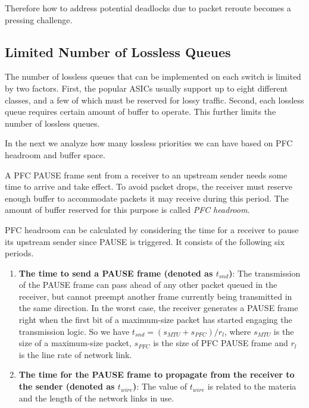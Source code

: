 {Therefore how to address potential deadlocks due to packet reroute becomes a pressing challenge.


\subsection{Limited Number of Lossless Queues}\label{subsec:pfcheadroom}

The number of lossless queues that can be implemented on each switch is limited by two factors. First, the popular ASICs usually support up to eight different classes,
and a few of which must be reserved for lossy traffic. Second, each lossless queue requires certain amount of buffer to operate. This further limits the number of
lossless queues.

In the next we analyze how many lossless priorities we can have based on PFC headroom and buffer space.

A PFC PAUSE frame sent from a receiver to an upstream sender needs some time to arrive and take effect. To avoid packet drops, the receiver must reserve enough buffer to accommodate packets it may receive during this period. The amount of buffer reserved for this purpose is called \textit{PFC headroom}. 

PFC headroom can be calculated by considering the time for a receiver to pause its upstream sender since  PAUSE is triggered. It consists of the following six periods.

\begin{enumerate}
	
\item\textbf{The time to send a PAUSE frame (denoted as $t_{snd}$)}: The transmission of the PAUSE frame  can pass ahead of any other packet queued in the receiver, but cannot preempt another frame currently being transmitted in the same direction. In the worst case, the receiver generates a PAUSE frame right when the first bit of a maximum-size packet has started engaging the transmission logic. So we have  $t_{snd}=(s_{MTU}+s_{PFC})/r_{l}$, where $s_{MTU}$ is the size of a maximum-size packet, $s_{PFC}$ is the size of PFC PAUSE frame and $r_{l}$ is the line rate of network link.

\item\textbf{The time for the PAUSE frame to propagate from the receiver to the sender (denoted as $t_{wire}$)}: The value of  $t_{wire}$ is related to the materia and the length of the network links in use.


\end{enumerate}}
